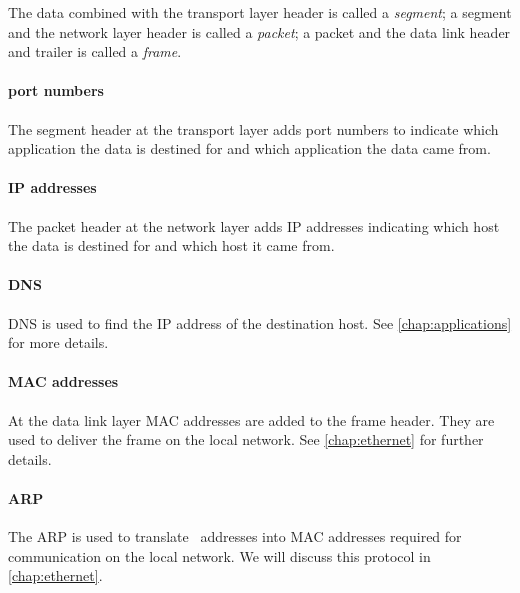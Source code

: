 The data combined with the transport layer header is called a \emph{segment};
a segment and the network layer header is called a \emph{packet};
a packet and the data link header and trailer is called a \emph{frame}.

\paragraph{port numbers}
The segment header at the transport layer adds port numbers to indicate which application the data is destined for and which application the data came from.


\paragraph{\acs{IP} addresses}
The packet header at the network layer adds \acs{IP} addresses indicating which host the data is destined for and which host it came from.


\paragraph{\acf{DNS}}
\acs{DNS} is used to find the \acs{IP} address of the destination host.
See \vref{chap:applications} for more details.


\paragraph{\acs{MAC} addresses}
At the data link layer \acs{MAC} addresses are added to the frame header.
They are used to deliver the frame on the local network.
See \vref{chap:ethernet} for further details.

\paragraph{\acf{ARP}}
The \acl{ARP} is used to translate \IP\ addresses into \acs{MAC} addresses required for communication on the local network.
We will discuss this protocol in \vref{chap:ethernet}.

